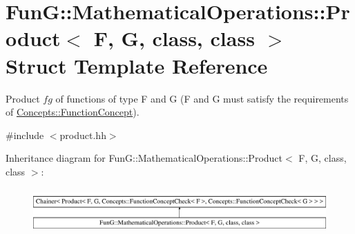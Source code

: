 \hypertarget{structFunG_1_1MathematicalOperations_1_1Product}{}\section{FunG\+:\+:Mathematical\+Operations\+:\+:Product$<$ F, G, class, class $>$ Struct Template Reference}
\label{structFunG_1_1MathematicalOperations_1_1Product}


Product $fg$ of functions of type F and G (F and G must satisfy the requirements of \hyperlink{structFunG_1_1Concepts_1_1FunctionConcept}{Concepts\+::\+Function\+Concept}).  




{\ttfamily \#include $<$product.\+hh$>$}

Inheritance diagram for FunG\+:\+:Mathematical\+Operations\+:\+:Product$<$ F, G, class, class $>$\+:\begin{figure}[H]
\begin{center}
\leavevmode
\includegraphics[height=1.728395cm]{structFunG_1_1MathematicalOperations_1_1Product}
\end{center}
\end{figure}
